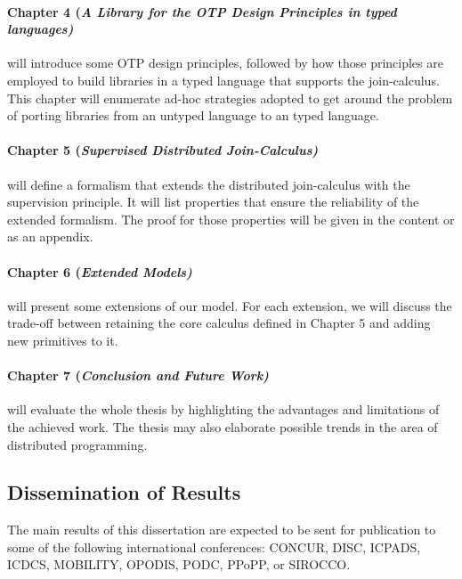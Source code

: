 \paragraph{Chapter 4 (\it{A Library for the OTP Design Principles in typed languages})} will introduce some OTP design principles, followed by how those principles are employed to build libraries in a typed language that supports the join-calculus.  This chapter will enumerate ad-hoc strategies adopted to get around the problem of porting libraries from an untyped language to an typed language.

\paragraph{Chapter 5 (\it{Supervised Distributed Join-Calculus})} will define a formalism that extends the distributed join-calculus with the supervision principle.  It will list properties that ensure the reliability of the extended formalism.  The proof for those properties will be given in the content or as an appendix.

\paragraph{Chapter 6 (\it{Extended Models})} will present some extensions of our model.  For each extension, we will discuss the trade-off between retaining the core calculus defined in Chapter 5 and adding new primitives to it.

\paragraph{Chapter 7 (\it{Conclusion and Future Work})} will evaluate the whole thesis by highlighting the advantages and limitations of the achieved work.  The thesis may also elaborate possible trends in the area of distributed programming.  

\subsection{Dissemination of Results}

The main results of this dissertation are expected to be sent for publication to some of the following international conferences: CONCUR, DISC, ICPADS, ICDCS, MOBILITY, OPODIS, PODC, PPoPP, or SIROCCO.